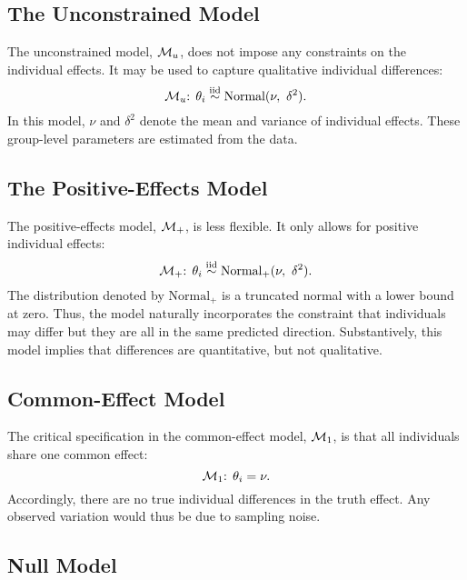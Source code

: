 \documentclass[
  english,
  ,man,floatsintext]{apa6}
\begin{document}
\hypertarget{the-unconstrained-model}{%
\subsection{The Unconstrained Model}\label{the-unconstrained-model}}

The unconstrained model, \({\cal M}_u\), does not impose any constraints on the individual effects. It may be used to capture qualitative individual differences:
\begin{equation}
 {\cal M}_u\text{: }\theta_i \overset{\text{iid}}{\sim} \text{Normal}(\nu,\ \delta^2).
\end{equation}
In this model, \(\nu\) and \(\delta^2\) denote the mean and variance of individual effects. These group-level parameters are estimated from the data.

\hypertarget{the-positive-effects-model}{%
\subsection{The Positive-Effects Model}\label{the-positive-effects-model}}

The positive-effects model, \({\cal M}_{+}\), is less flexible. It only allows for positive individual effects:
\begin{equation}
 {\cal M}_{+}\text{: }\theta_i \overset{\text{iid}}{\sim} \text{Normal}_{+}(\nu,\ \delta^2).
\end{equation}
The distribution denoted by \(\text{Normal}_{+}\) is a truncated normal with a lower bound at zero. Thus, the model naturally incorporates the constraint that individuals may differ but they are all in the same predicted direction. Substantively, this model implies that differences are quantitative, but not qualitative.

\hypertarget{common-effect-model}{%
\subsection{Common-Effect Model}\label{common-effect-model}}

The critical specification in the common-effect model, \({\cal M}_1\), is that all individuals share one common effect:
\begin{equation}
 {\cal M}_{1}\text{: }\theta_i = \nu.
\end{equation}
Accordingly, there are no true individual differences in the truth effect. Any observed variation would thus be due to sampling noise.

\hypertarget{null-model}{%
\subsection{Null Model}\label{null-model}}
\end{document}
